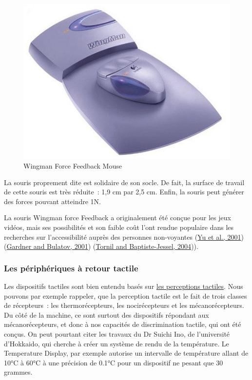 \documentclass[
]{book}
\begin{document}
\begin{figure}
\centering
\includegraphics{img/wingFFM.jpg}
\caption{\label{fig:wingman}Wingman Force Feedback Mouse}
\end{figure}

La souris proprement dite est solidaire de son socle. De fait, la surface
de travail de cette souris est très réduite~: 1,9 cm par 2,5 cm. Enfin,
la souris peut générer des forces pouvant atteindre 1N.

La souris Wingman force Feedback a originalement été conçue pour les jeux
vidéos, mais ses possibilités et son faible coût l'ont rendue populaire dans
les recherches sur l'accessibilité auprès des personnes non-voyantes
(\protect\hyperlink{ref-yu2001haptic}{Yu et al., 2001}) (\protect\hyperlink{ref-gardner2001smart}{Gardner and Bulatov, 2001}) (\protect\hyperlink{ref-tornil2004use}{Tornil and Baptiste-Jessel, 2004})).

\hypertarget{les-puxe9riphuxe9riques-uxe0-retour-tactile}{%
\subsubsection{Les périphériques à retour tactile}\label{les-puxe9riphuxe9riques-uxe0-retour-tactile}}

Les dispositifs tactiles sont bien entendu basés sur \href{007-le-systeme-haptique-cote-perception-la-somesthesie.html\#toc3}{les perceptions
tactiles}.
Nous pouvons par exemple rappeler, que la perception
tactile est le fait de trois classes de récepteurs~: les thermorécepteurs,
les nocirécepteurs et les mécanorécepteurs. Du côté de la machine, ce sont
surtout des dispositifs répondant aux mécanorécepteurs, et donc à nos
capacités de discrimination tactile, qui ont été conçus. On peut pourtant
citer les travaux du Dr Suichi Ino, de l'université d'Hokkaido, qui cherche à
créer un système de rendu de la température. Le Temperature Display, par
exemple autorise un intervalle de température allant de 10°C à 60°C à une
précision de 0.1°C pour un dispositif ne pesant que 30 grammes.
\end{document}
